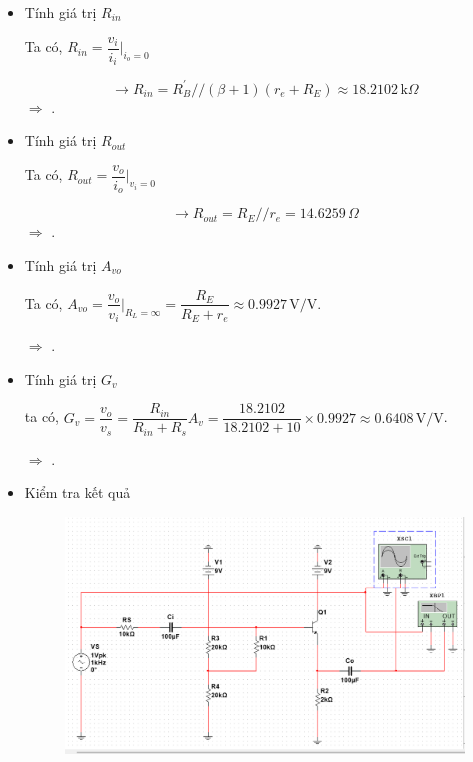 \begin{itemize}[label=-]
	\item Tính giá trị $R_{in}$
	
	Ta có, $R_{in} = \dfrac{v_{i}}{i_{i}}|_{i_{o} = 0}$

	\[ \rightarrow R_{in} = R_{B}^{'} // (\beta + 1)(r_{e} + R_{E}) \approx 18.2102\,\text{k}\Omega \]
	$\Rightarrow$ .
	
	\item Tính giá trị $R_{out}$
	
	Ta có, $R_{out} = \dfrac{v_{o}}{i_{o}}|_{v_{i} = 0}$ 
	
	\[\rightarrow R_{out} = R_{E} // r_{e} = 14.6259\,\Omega \]
	$\Rightarrow$ .
	
	\item Tính giá trị $A_{vo}$
	
	Ta có, $A_{vo} = \dfrac{v_{o}}{v_{i}}|_{R_{L} = \infty} = \dfrac{R_{E}}{R_{E} + r_{e}} \approx 0.9927\,\text{V/V}$.
	
	$\Rightarrow$ .
	
	\item Tính giá trị $G_{v}$
	
	ta có, $G_{v} = \dfrac{v_{o}}{v_{s}} = \dfrac{R_{in}}{R_{in} + R_{s}} A_{v} = \dfrac{18.2102}{18.2102 + 10}\times 0.9927 \approx 0.6408 \,\text{V/V}$.
	
	$\Rightarrow$ . 
	
	\item Kiểm tra kết quả
	
	\begin{figure}[H]
		\centering
		\includegraphics[width=.8\linewidth]{./my-chapters/my-images/Question4/cauc_test.png}
	\end{figure}
	

\end{itemize}
